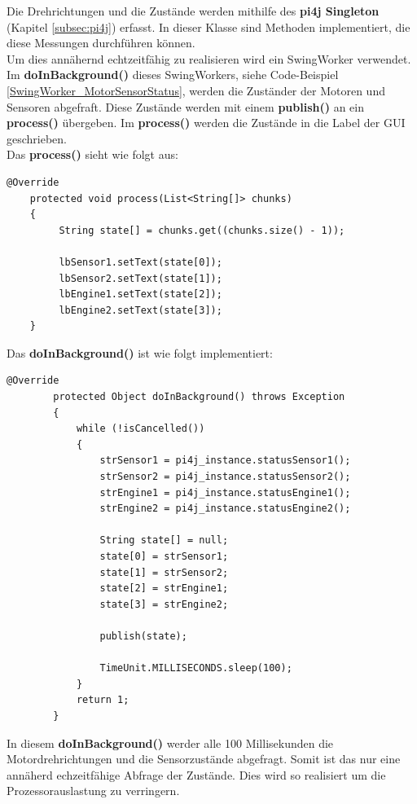 Die Drehrichtungen und die Zustände werden mithilfe des \textbf{pi4j Singleton} (Kapitel \ref{subsec:pi4j}) erfasst. In dieser Klasse sind Methoden implementiert, die diese Messungen durchführen können.
\\ Um dies annähernd echtzeitfähig zu realisieren wird ein SwingWorker verwendet. Im \textbf{doInBackground()} dieses SwingWorkers, siehe Code-Beispiel \ref{SwingWorker_MotorSensorStatus}, werden die Zuständer der Motoren und Sensoren abgefraft. Diese Zustände werden mit einem \textbf{publish()} an ein \textbf{process()} übergeben. Im \textbf{process()} werden die Zustände in die Label der GUI geschrieben.
\\ Das \textbf{process()} sieht wie folgt aus:
\begin{lstlisting}[style=JavaStyle, caption= Label aktualisieren]
	@Override
    protected void process(List<String[]> chunks)
    {
         String state[] = chunks.get((chunks.size() - 1));
            
         lbSensor1.setText(state[0]);
         lbSensor2.setText(state[1]);
         lbEngine1.setText(state[2]);
         lbEngine2.setText(state[3]);
    } 
\end{lstlisting}
Das \textbf{doInBackground()} ist wie folgt implementiert:
\begin{lstlisting}[style=JavaStyle, caption= Motor- und Sensorzustände, label=SwingWorker_MotorSensorStatus]
	@Override
        protected Object doInBackground() throws Exception
        {                        
            while (!isCancelled())
            {
                strSensor1 = pi4j_instance.statusSensor1();
                strSensor2 = pi4j_instance.statusSensor2();
                strEngine1 = pi4j_instance.statusEngine1();
                strEngine2 = pi4j_instance.statusEngine2();
                
                String state[] = null;
                state[0] = strSensor1;
                state[1] = strSensor2;
                state[2] = strEngine1;
                state[3] = strEngine2;
                
                publish(state);
                
                TimeUnit.MILLISECONDS.sleep(100);
            } 
            return 1;            
        }

\end{lstlisting}
In diesem \textbf{doInBackground()} werder  alle 100 Millisekunden die Motordrehrichtungen und die Sensorzustände abgefragt. Somit ist das nur eine annäherd echzeitfähige Abfrage der Zustände. Dies wird so realisiert um die Prozessorauslastung zu verringern.

